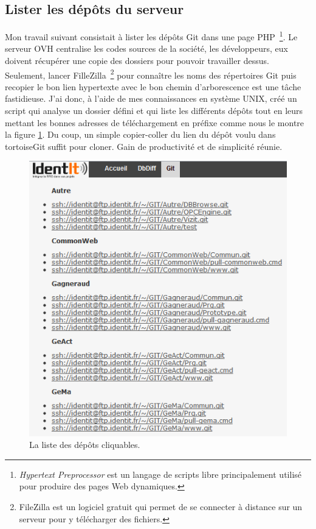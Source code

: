 
\subsection{Lister les dépôts du serveur}

Mon travail suivant consistait à lister les dépôts Git dans une page PHP\,
\footnote{\emph{Hypertext Preprocessor} est un langage de scripts libre
principalement utilisé pour produire des pages Web dynamiques.}. Le serveur OVH
centralise les codes sources de la société, les développeurs, eux doivent
récupérer une copie des dossiers pour pouvoir travailler dessus. Seulement,
lancer FilleZilla\, \footnote{FileZilla est un logiciel gratuit qui permet de
se connecter à distance sur un serveur pour y télécharger des fichiers.} pour
connaître les noms des répertoires Git puis recopier le bon lien hypertexte
avec le bon chemin d'arborescence est une tâche fastidieuse.  J'ai donc, à
l'aide de mes connaissances en système UNIX, créé un script qui analyse un
dossier défini et qui liste les différents dépôts tout en leurs mettant les
bonnes adresses de téléchargement en préfixe comme nous le montre la figure
\ref{repo}. Du coup, un simple copier-coller du lien du dépôt voulu dans
tortoiseGit suffit pour cloner. Gain de productivité et de simplicité réunie.

\begin{figure}
\begin{center}
\includegraphics[scale=0.5]{images/repo.png}
\caption{La liste des dépôts cliquables.}
\label{repo}
\end{center}
\end{figure}

